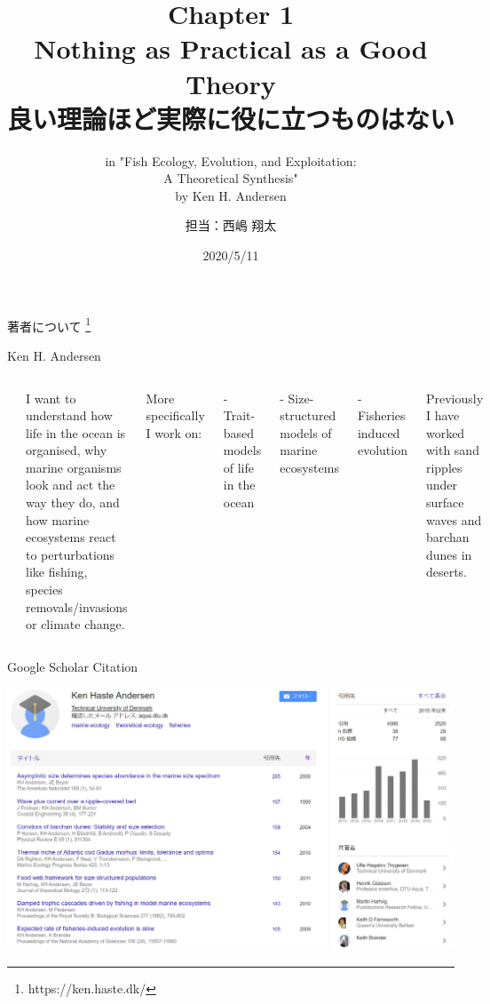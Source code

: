\documentclass[
  ignorenonframetext,
]{beamer}
\title{Chapter 1\\
Nothing as Practical as a Good Theory\\
良い理論ほど実際に役に立つものはない}
\subtitle{in "Fish Ecology, Evolution, and Exploitation:\\
A Theoretical Synthesis"\\
by Ken H. Andersen}
\author{担当：西嶋 翔太}
\date{2020/5/11}
\newcommand{\vspacesmall}{\vspace{3mm}}
\begin{document}
\frame{\titlepage}

\begin{frame}{著者について \footnote[frame]{https://ken.haste.dk/}}
\protect\hypertarget{ux8457ux8005ux306bux3064ux3044ux3066}{}

\begin{block}{Ken H. Andersen}

\begin{columns}


\includegraphics[width=100px]{KenAndersen} 


I want to understand how life in the ocean is organised, why marine organisms look and act the way they do, and how marine ecosystems react to perturbations like  fishing, species removals/invasions or climate change.  
  
\vspacesmall
More specifically I work on:  

- Trait-based models of life in the ocean  

- Size-structured models of marine ecosystems  

- Fisheries induced  evolution  
  
\vspacesmall
Previously I have worked with sand ripples under surface waves and barchan dunes in deserts.

\end{columns}

\end{block}

\end{frame}

\begin{frame}{Google Scholar Citation}
\protect\hypertarget{google-scholar-citation}{}

\includegraphics{GoogleScholarCitation.png}

\end{frame}
\end{document}
